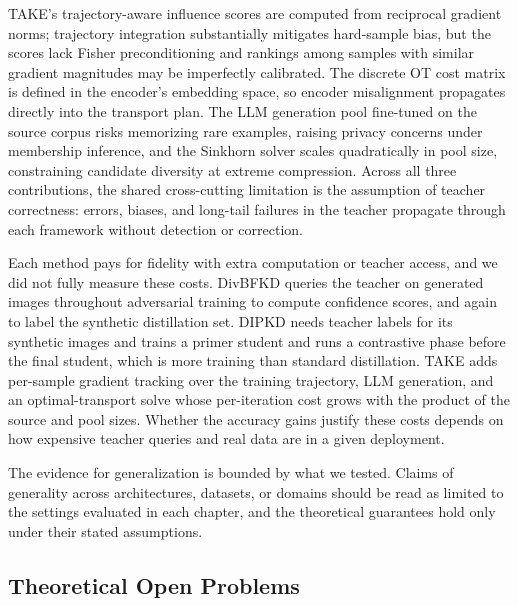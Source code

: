 \begin{foldable}
  TAKE's trajectory-aware influence scores are computed from reciprocal gradient norms; trajectory integration substantially mitigates hard-sample bias, but the scores lack Fisher preconditioning and rankings among samples with similar gradient magnitudes may be imperfectly calibrated.
  The discrete \ac{OT} cost matrix is defined in the encoder's embedding space, so encoder misalignment propagates directly into the transport plan.
  The \ac{LLM} generation pool fine-tuned on the source corpus risks memorizing rare examples, raising privacy concerns under membership inference, and the Sinkhorn solver scales quadratically in pool size, constraining candidate diversity at extreme compression.
  Across all three contributions, the shared cross-cutting limitation is the assumption of teacher correctness: errors, biases, and long-tail failures in the teacher propagate through each framework without detection or correction.
\end{foldable}

\begin{foldable}
  Each method pays for fidelity with extra computation or teacher access, and we did not fully measure these costs.
  DivBFKD queries the teacher on generated images throughout adversarial training to compute confidence scores, and again to label the synthetic distillation set.
  DIPKD needs teacher labels for its synthetic images and trains a primer student and runs a contrastive phase before the final student, which is more training than standard distillation.
  TAKE adds per-sample gradient tracking over the training trajectory, \ac{LLM} generation, and an optimal-transport solve whose per-iteration cost grows with the product of the source and pool sizes.
  Whether the accuracy gains justify these costs depends on how expensive teacher queries and real data are in a given deployment.
\end{foldable}

\begin{foldable}
  The evidence for generalization is bounded by what we tested.
  Claims of generality across architectures, datasets, or domains should be read as limited to the settings evaluated in each chapter, and the theoretical guarantees hold only under their stated assumptions.
\end{foldable}

\subsection{Theoretical Open Problems} \label{subsec:62-conclusion-future-theoretical}

